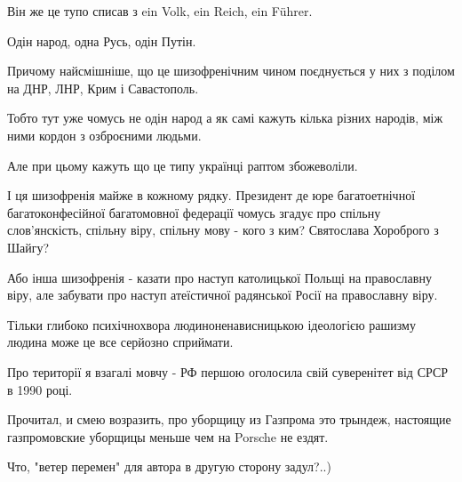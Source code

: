 \begin{itemize}
 

Він же це тупо списав з ein Volk, ein Reich, ein Führer.

Одін народ, одна Русь, одін Путін.

Причому найсмішніше, що це шизофренічним чином поєднується у них з поділом на
ДНР, ЛНР, Крим і Савастополь.

Тобто тут уже чомусь не одін народ а як самі кажуть кілька різних народів, між
ними кордон з озброєними людьми.

Але при цьому кажуть що це типу українці раптом збожеволіли.

І ця шизофренія майже в кожному рядку. Президент де юре багатоетнічної
багатоконфесійної багатомовної федерації чомусь згадує про спільну
слов'янскість, спільну віру, спільну мову - кого з ким? Святослава Хороброго з
Шайгу?

Або інша шизофренія - казати про наступ католицької Польщі на православну віру,
але забувати про наступ атеїстичної радянської Росії на православну віру.

Тільки глибоко психічнохвора людиноненависницькою ідеологією рашизму людина
може це все серйозно сприймати.

Про території я взагалі мовчу - РФ першою оголосила свій суверенітет від СРСР в
1990 році.


 
Прочитал, и смею возразить, про уборщицу из Газпрома это трындеж, настоящие
газпромовские уборщицы меньше чем на Porsche не ездят.

 
Что, "ветер перемен" для автора в другую сторону задул?..)

 


\end{itemize}
